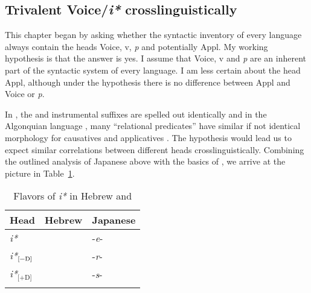 \begin{exe}
\begin{xlist}
\begin{xlist}
\begin{xlist}
\begin{xlist}
\begin{xlist}
\begin{xlist}
\begin{exe}
\begin{xlist}
\begin{exe}
\begin{exe}
\begin{xlist}
\begin{exe}
\begin{exe}
\begin{xlist}
\begin{exe}
\begin{xlist}
\begin{exe}
\begin{xlist}
\begin{exe}
\begin{xlist}
\begin{exe}
\begin{xlist}
	\subsection{Trivalent Voice/\textit{i*} crosslinguistically} \label{i:i:ay} \label{r1:g:1}
This chapter began by asking whether the syntactic inventory of every language always contain the heads Voice, v, \textit{p} and potentially Appl. My working hypothesis is that the answer is yes. I assume that Voice, v and \emph{p} are an inherent part of the syntactic system of every language. I am less certain about the  head Appl, although under the \textit{} hypothesis there is no difference between Appl and Voice or \textit{p}. 

In , the  and instrumental  suffixes are spelled out identically \citep{jerro17} and in the Algonquian language , many ``relational predicates'' have similar if not identical morphology for causatives and applicatives \citep[Ch.~2.3.7.1]{quinn06phd}. The \emph{} hypothesis would lead us to expect similar correlations between different heads crosslinguistically. Combining the outlined analysis of Japanese above with the basics of \emph{}, we arrive at the picture in Table~\ref{table:heads-langs2}.

\begin{table}
	\begin{tabular}{lll}
 \lsptoprule
	Head 		& Hebrew 	  		& Japanese\\\midrule
	\emph{i*}   	& \tkal          & -\emph{e}-\\
	\emph{i*}$_{\text{[\textminus{}D]}}$ 	& \tnif 		& -\emph{r}-\\
	\emph{i*}$_{\text{[+D]}}$	& \thif		& -\emph{s}-\\
\lspbottomrule
 	\end{tabular}
	\caption{Flavors of \textit{i*} in Hebrew and \label{table:heads-langs2}}
\end{table}


\end{xlist}
\end{exe}
\end{xlist}
\end{exe}
\end{xlist}
\end{exe}
\end{xlist}
\end{exe}
\end{xlist}
\end{exe}
\end{exe}
\end{xlist}
\end{exe}
\end{exe}
\end{xlist}
\end{exe}
\end{xlist}
\end{xlist}
\end{xlist}
\end{xlist}
\end{xlist}
\end{xlist}
\end{exe}
